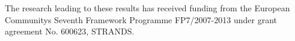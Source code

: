 The research leading to these results has received funding from the European Communitys Seventh Framework Programme FP7/2007-2013 under grant agreement No. 600623, STRANDS.
